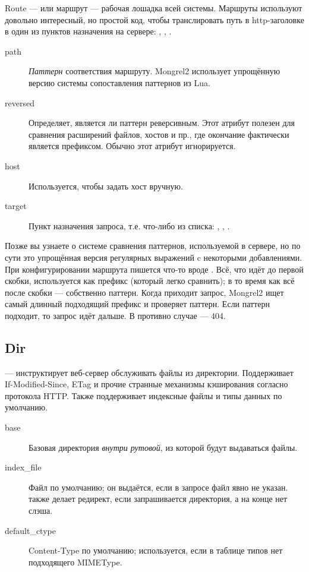 Route --- или маршрут --- рабочая лошадка всей системы. Маршруты
используют довольно интересный, но простой код, чтобы транслировать
путь в http-заголовке в один из пунктов назначения на сервере:
, , .

\begin{description}
\item[path] \emph{Паттерн} соответствия маршруту. Mongrel2 использует
    упрощённую версию системы сопоставления паттернов из Lua.
\item[reversed] Определяет, является ли паттерн реверсивным. Этот
    атрибут полезен для сравнения расширений файлов, хостов и пр., где
    окончание фактически является префиксом. Обычно этот атрибут игнорируется.
\item[host] Используется, чтобы задать хост вручную.
\item[target] Пункт назначения запроса, т.е. что-либо из списка:
, , .
\end{description}

Позже вы узнаете о системе сравнения паттернов, используемой в
сервере, но по сути это упрощённая версия регулярных выражений c
некоторыми добавлениями. При конфигурировании маршрута пишется
что-то вроде . Всё, что идёт до первой скобки,
используется как префикс (который легко сравнить); в то время как всё
после скобки --- собственно паттерн. Когда приходит запрос, Mongrel2
ищет самый длинный подходящий префикс и проверяет паттерн. Если
паттерн подходит, то запрос идёт дальше. В противно случае --- 404.

\subsection{Dir}

 --- инструктирует веб-сервер обслуживать файлы из
директории. Поддерживает If-Modified-Since, ETag и прочие странные
механизмы кэширования согласно протокола HTTP. Также поддерживает
индексные файлы и типы данных по умолчанию.

\begin{description}
\item[base] Базовая директория \emph{внутри рутовой}, из которой будут
    выдаваться файлы.
\item[index\_file] Файл по умолчанию; он выдаётся, если в запросе файл явно
    не указан.  также делает редирект, если запрашивается
    директория, а на конце нет слэша.
\item[default\_ctype] Content-Type по умолчанию; используется, если в
    таблице типов нет подходящего MIMEType.
\end{description}

